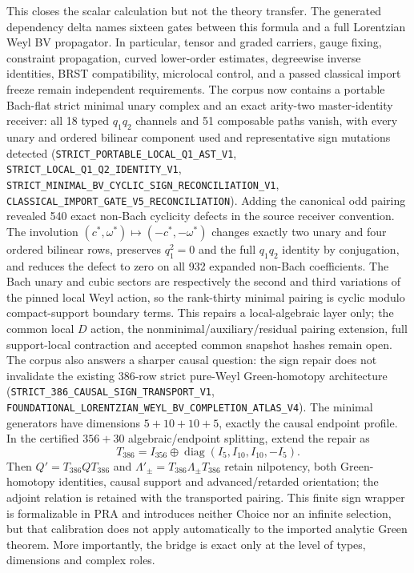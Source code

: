 \documentclass[11pt]{article}
\theoremstyle{definition}
\theoremstyle{remark}
\newcommand{\cert}[1]{\nolinkurl{#1}}
\begin{document}
This closes the scalar calculation but not the theory transfer.  The generated
dependency delta names sixteen gates between this formula and a full
Lorentzian Weyl BV propagator.  In particular, tensor and graded carriers,
gauge fixing, constraint propagation, curved lower-order estimates,
degreewise inverse identities, BRST compatibility, microlocal control, and a
passed classical import freeze remain independent requirements.  The corpus
now contains a portable Bach-flat strict minimal unary complex and an exact
arity-two master-identity receiver: all 18 typed \(q_1q_2\) channels and 51
composable paths vanish, with every unary and ordered bilinear component used
and representative sign mutations detected
(\cert{STRICT_PORTABLE_LOCAL_Q1_AST_V1},
\cert{STRICT_LOCAL_Q1_Q2_IDENTITY_V1},
\cert{STRICT_MINIMAL_BV_CYCLIC_SIGN_RECONCILIATION_V1},
\cert{CLASSICAL_IMPORT_GATE_V5_RECONCILIATION}).  Adding the canonical odd
pairing revealed 540 exact non-Bach cyclicity defects in the source receiver
convention.  The involution
\((c^*,\omega^*)\mapsto(-c^*,-\omega^*)\) changes exactly two unary and four
ordered bilinear rows, preserves \(q_1^2=0\) and the full \(q_1q_2\) identity
by conjugation, and reduces the defect to zero on all 932 expanded non-Bach
coefficients.  The Bach unary and cubic sectors are respectively the second
and third variations of the pinned local Weyl action, so the rank-thirty
minimal pairing is cyclic modulo compact-support boundary terms.  This
repairs a local-algebraic layer only; the common local \(D\) action, the
nonminimal/auxiliary/residual pairing extension, full support-local
contraction and accepted common snapshot hashes remain open.  The corpus
also answers a sharper causal question: the sign repair does not invalidate
the existing 386-row strict pure-Weyl Green-homotopy architecture
(\cert{STRICT_386_CAUSAL_SIGN_TRANSPORT_V1},
\cert{FOUNDATIONAL_LORENTZIAN_WEYL_BV_COMPLETION_ATLAS_V4}).  The minimal
generators have dimensions \(5+10+10+5\), exactly the causal endpoint
profile.  In the certified \(356+30\) algebraic/endpoint splitting, extend the
repair as
\[
 T_{386}=I_{356}\mathbin{\oplus}
   \operatorname{diag}(I_5,I_{10},I_{10},-I_5).
\]
Then \(Q'=T_{386}QT_{386}\) and
\(\Lambda'_\pm=T_{386}\Lambda_\pm T_{386}\) retain nilpotency, both
Green-homotopy identities, causal support and advanced/retarded orientation;
the adjoint relation is retained with the transported pairing.  This finite
sign wrapper is formalizable in PRA and introduces neither Choice nor an
infinite selection, but that calibration does not apply automatically to the
imported analytic Green theorem.  More importantly, the bridge is exact only
at the level of types, dimensions and complex roles.
\end{document}
